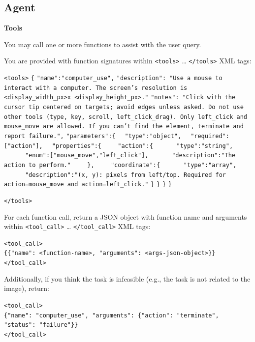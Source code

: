 \subsection{Agent}
\begin{tcolorbox}[
  title={Screenspot | Screenspot-Pro | OSWorld-G},
  fonttitle=\bfseries,
  colframe=black,
  colback=white,
  toptitle=1mm,
  bottomtitle=1mm,
  top=2mm,
  breakable
]
\textbf{Tools}

You may call one or more functions to assist with the user query.

You are provided with function signatures within \texttt{\textless tools\textgreater} \dots{} \texttt{\textless /tools\textgreater} XML tags:
\par\noindent\texttt{\textless tools\textgreater}
\texttt{\{}
\texttt{"name":"computer\_use",}
\texttt{"description": "Use a mouse to interact with a computer. The screen's resolution is \textless display\_width\_px\textgreater x \textless display\_height\_px\textgreater ."}
\texttt{"notes": "Click with the cursor tip centered on targets; avoid edges unless asked. Do not use other tools (type, key, scroll, left\_click\_drag). Only left\_click and mouse\_move are allowed. If you can't find the element, terminate and report failure.",}
\texttt{"parameters":\{}
\texttt{\ \ "type":"object",}
\texttt{\ \ "required":["action"],}
\texttt{\ \ "properties":\{}
\texttt{\ \ \ \ "action":\{}
\texttt{\ \ \ \ \ \ "type":"string",}
\texttt{\ \ \ \ \ \ "enum":["mouse\_move","left\_click"],}
\texttt{\ \ \ \ \ \ "description":"The action to perform."}
\texttt{\ \ \ \ \},}
\texttt{\ \ \ \ "coordinate":\{}
\texttt{\ \ \ \ \ \ "type":"array",}
\texttt{\ \ \ \ \ \ "description":"(x, y): pixels from left/top. Required for action=mouse\_move and action=left\_click."}
\texttt{\}}
\texttt{\}}
\texttt{\}}
\texttt{\}}

\texttt{\textless /tools\textgreater}

For each function call, return a JSON object with function name and arguments within \texttt{\textless tool\_call\textgreater} \dots{} \texttt{\textless /tool\_call\textgreater} XML tags:
\par\noindent\texttt{\textless tool\_call\textgreater}\\
\texttt{\{\{"name": \textless function-name\textgreater , "arguments": \textless args-json-object\textgreater \}\}}\\
\texttt{\textless /tool\_call\textgreater}

Additionally, if you think the task is infeasible (e.g., the task is not related to the image), return:
\par\noindent\texttt{\textless tool\_call\textgreater}\\
\texttt{\{"name": "computer\_use", "arguments": \{"action": "terminate", "status": "failure"\}\}}\\
\texttt{\textless /tool\_call\textgreater}
\end{tcolorbox}

